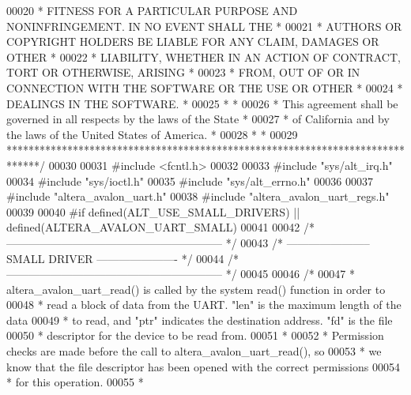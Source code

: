 \begin{DoxyCode}
00020 \textcolor{comment}{* FITNESS FOR A PARTICULAR PURPOSE AND NONINFRINGEMENT. IN NO EVENT SHALL THE *}
00021 \textcolor{comment}{* AUTHORS OR COPYRIGHT HOLDERS BE LIABLE FOR ANY CLAIM, DAMAGES OR OTHER      *}
00022 \textcolor{comment}{* LIABILITY, WHETHER IN AN ACTION OF CONTRACT, TORT OR OTHERWISE, ARISING     *}
00023 \textcolor{comment}{* FROM, OUT OF OR IN CONNECTION WITH THE SOFTWARE OR THE USE OR OTHER         *}
00024 \textcolor{comment}{* DEALINGS IN THE SOFTWARE.                                                   *}
00025 \textcolor{comment}{*                                                                             *}
00026 \textcolor{comment}{* This agreement shall be governed in all respects by the laws of the State   *}
00027 \textcolor{comment}{* of California and by the laws of the United States of America.              *}
00028 \textcolor{comment}{*                                                                             *}
00029 \textcolor{comment}{******************************************************************************/}
00030 
00031 \textcolor{preprocessor}{#include <fcntl.h>}
00032 
00033 \textcolor{preprocessor}{#include "sys/alt_irq.h"}
00034 \textcolor{preprocessor}{#include "sys/ioctl.h"}
00035 \textcolor{preprocessor}{#include "sys/alt_errno.h"}
00036 
00037 \textcolor{preprocessor}{#include "altera_avalon_uart.h"}
00038 \textcolor{preprocessor}{#include "altera_avalon_uart_regs.h"}
00039 
00040 \textcolor{preprocessor}{#if defined(ALT\_USE\_SMALL\_DRIVERS) || defined(ALTERA\_AVALON\_UART\_SMALL)}
00041 
00042 \textcolor{comment}{/* ----------------------------------------------------------- */}
00043 \textcolor{comment}{/* ----------------------- SMALL DRIVER ---------------------- */}
00044 \textcolor{comment}{/* ----------------------------------------------------------- */}
00045 
00046 \textcolor{comment}{/*}
00047 \textcolor{comment}{ * altera\_avalon\_uart\_read() is called by the system read() function in order to}
00048 \textcolor{comment}{ * read a block of data from the UART. "len" is the maximum length of the data}
00049 \textcolor{comment}{ * to read, and "ptr" indicates the destination address. "fd" is the file}
00050 \textcolor{comment}{ * descriptor for the device to be read from.}
00051 \textcolor{comment}{ *}
00052 \textcolor{comment}{ * Permission checks are made before the call to altera\_avalon\_uart\_read(), so}
00053 \textcolor{comment}{ * we know that the file descriptor has been opened with the correct permissions}
00054 \textcolor{comment}{ * for this operation.}
00055 \textcolor{comment}{ *}

\end{DoxyCode}
